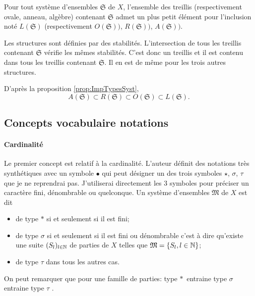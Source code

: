 \begin{propn}
  Pour tout système d'ensembles $\mathfrak{S}$ de $X$, l'ensemble des treillis (respectivement ovale, anneau, algèbre) contenant $\mathfrak{S}$ admet un plus petit élément pour l'inclusion noté $L(\mathfrak{S})$ (respectivement $O(\mathfrak{S}))$, $R(\mathfrak{S}))$, $A(\mathfrak{S}))$.
\end{propn}
\begin{demo}
Les structures sont définies par des stabilités. L'intersection de tous les treillis contenant $\mathfrak{S}$ vérifie les mêmes stabilités. C'est donc un treillis et il est contenu dans tous les treillis contenant $\mathfrak{S}$. Il en est de même pour les trois autres structures.
\end{demo}
D'après la proposition \ref{prop:ImpTypesSyst},
\begin{displaymath}
 A(\mathfrak{S}) \subset R(\mathfrak{S}) \subset O(\mathfrak{S}) \subset L(\mathfrak{S}).
\end{displaymath}

\subsection{Concepts vocabulaire notations}\label{types cardinalité}

\paragraph{Cardinalité}
Le premier concept est relatif à la cardinalité. L'auteur définit des notations très synthétiques avec un symbole $\bullet$ qui peut  désigner un des trois symboles $\star$, $\sigma$, $\tau$ que je ne reprendrai pas. J'utiliserai directement les 3 symboles pour préciser un caractère fini, dénombrable ou quelconque.\newline
Un système d'ensembles $\mathfrak{M}$ de $X$ est dit
\begin{itemize}
 \item de type $*$ si et seulement si il est fini;
 \item de type $\sigma$ si et seulement si il est fini ou dénombrable c'est à dire qu'existe une suite $(S_l)_{l\in \mathbb{N}}$ de parties de $X$ telles que $\mathfrak{M}= \left\lbrace S_l , l\in \mathbb{N} \right\rbrace$;
 \item de type $\tau$ dans tous les autres cas.
\end{itemize}
On peut remarquer que pour une famille de parties: \og type $*$\fg\, entraine \og type $\sigma$ \fg \, entraine \og type $\tau$ \fg.

